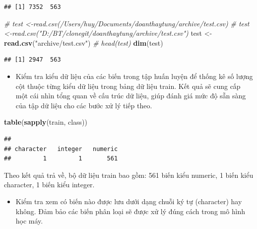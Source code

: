 \documentclass[
]{article}
\newenvironment{Shaded}{\begin{snugshade}}{\end{snugshade}}
\newcommand{\CommentTok}[1]{\textcolor[rgb]{0.56,0.35,0.01}{\textit{#1}}}
\newcommand{\FunctionTok}[1]{\textcolor[rgb]{0.13,0.29,0.53}{\textbf{#1}}}
\newcommand{\NormalTok}[1]{#1}
\newcommand{\OtherTok}[1]{\textcolor[rgb]{0.56,0.35,0.01}{#1}}
\newcommand{\StringTok}[1]{\textcolor[rgb]{0.31,0.60,0.02}{#1}}
\providecommand{\tightlist}{%
  \setlength{\itemsep}{0pt}\setlength{\parskip}{0pt}}
\begin{document}
\begin{verbatim}
## [1] 7352  563
\end{verbatim}

\begin{Shaded}
\begin{Highlighting}[]
\CommentTok{\# test \textless{}{-}read.csv(\textquotesingle{}/Users/huy/Documents/doanthaytung/archive/test.csv\textquotesingle{})}
\CommentTok{\# test \textless{}{-}read.csv("D:/BT/clonegit/doanthaytung/archive/test.csv")}
\NormalTok{test }\OtherTok{\textless{}{-}} \FunctionTok{read.csv}\NormalTok{(}\StringTok{"archive/test.csv"}\NormalTok{)}
\CommentTok{\# head(test)}
\FunctionTok{dim}\NormalTok{(test)}
\end{Highlighting}
\end{Shaded}

\begin{verbatim}
## [1] 2947  563
\end{verbatim}

\begin{itemize}
\tightlist
\item
  Kiểm tra kiểu dữ liệu của các biến trong tập huấn luyện để thống kê số
  lượng cột thuộc từng kiểu dữ liệu trong bảng dữ liệu train. Kết quả sẽ
  cung cấp một cái nhìn tổng quan về cấu trúc dữ liệu, giúp đánh giá mức
  độ sẵn sàng của tập dữ liệu cho các bước xử lý tiếp theo.
\end{itemize}

\begin{Shaded}
\begin{Highlighting}[]
\FunctionTok{table}\NormalTok{(}\FunctionTok{sapply}\NormalTok{(train, class))}
\end{Highlighting}
\end{Shaded}

\begin{verbatim}
## 
## character   integer   numeric 
##         1         1       561
\end{verbatim}

Theo kết quả trả về, bộ dữ liệu train bao gồm: 561 biến kiểu numeric, 1
biến kiểu character, 1 biến kiểu integer.

\begin{itemize}
\tightlist
\item
  Kiểm tra xem có biến nào được lưu dưới dạng chuỗi ký tự (character)
  hay không. Đảm bảo các biến phân loại sẽ được xử lý đúng cách trong mô
  hình học máy.
\end{itemize}
\end{document}
